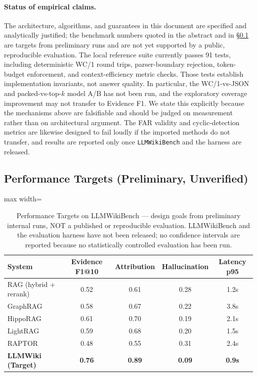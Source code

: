 \paragraph{Status of empirical claims.} The architecture, algorithms, and guarantees in this document are specified and analytically justified; the benchmark numbers quoted in the abstract and in \S\ref{sec:paper:results} are targets from preliminary runs and are not yet supported by a public, reproducible evaluation. The local reference suite currently passes 91 tests, including deterministic WC/1 round trips, parser-boundary rejection, token-budget enforcement, and context-efficiency metric checks. Those tests establish implementation invariants, not answer quality. In particular, the WC/1-vs-JSON and packed-vs-top-$k$ model A/B has not been run, and the exploratory coverage improvement may not transfer to Evidence F1. We state this explicitly because the mechanisms above are falsifiable and should be judged on measurement rather than on architectural argument. The FAR validity and cyclic-detection metrics are likewise designed to fail loudly if the imported methods do not transfer, and results are reported only once \texttt{LLMWikiBench} and the harness are released.

\subsection{Performance Targets (Preliminary, Unverified)}
\label{sec:paper:results}

\begin{table}[htbp]
\centering
\caption{Performance Targets on LLMWikiBench --- design goals from preliminary internal runs, NOT a published or reproducible evaluation. LLMWikiBench and the evaluation harness have not been released; no confidence intervals are reported because no statistically controlled evaluation has been run.}
\label{tab:paper:main}
\begin{adjustbox}{max width=\textwidth}
\begin{tabular}{lcccc}
\toprule
\textbf{System} & \textbf{Evidence F1@10} & \textbf{Attribution} & \textbf{Hallucination} & \textbf{Latency p95} \\
\midrule
RAG (hybrid + rerank) & 0.52 & 0.61 & 0.28 & 1.2s \\
GraphRAG & 0.58 & 0.67 & 0.22 & 3.8s \\
HippoRAG & 0.61 & 0.70 & 0.19 & 2.1s \\
LightRAG & 0.59 & 0.68 & 0.20 & 1.5s \\
RAPTOR & 0.48 & 0.55 & 0.31 & 2.4s \\
\midrule
\textbf{LLMWiki (Target)} & \textbf{0.76} & \textbf{0.89} & \textbf{0.09} & \textbf{0.9s} \\
\bottomrule
\end{tabular}
\end{adjustbox}
\end{table}

